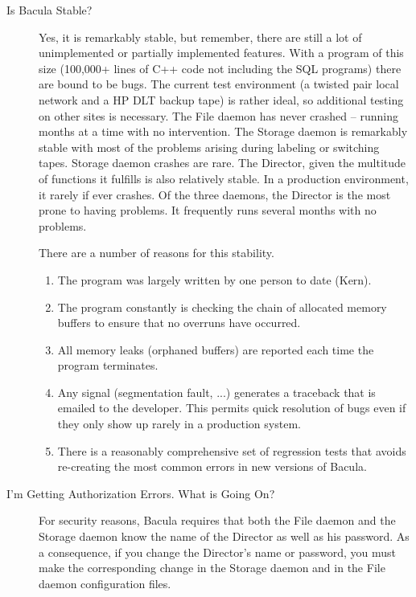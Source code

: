 \begin{description}
\label{stable}
\item [Is Bacula Stable? ]
   Yes, it is remarkably stable, but remember, there are  still a lot of
   unimplemented or partially implemented features.  With a program of this size
   (100,000+ lines of C++ code  not including the SQL programs) there are bound
   to be bugs.  The current test environment (a twisted pair local network and a
   HP DLT  backup tape) is rather ideal, so additional testing on other  sites is
   necessary. The File daemon has never crashed -- running  months at a time with
   no intervention. The Storage daemon is  remarkably stable with most of the
   problems arising during labeling  or switching tapes. Storage daemon crashes
   are rare.  The Director, given the multitude of functions it fulfills is  also
   relatively stable. In a production environment, it rarely  if ever crashes. Of
   the three daemons, the Director is the most  prone to having problems. It
   frequently runs several months with  no problems.  

   There are a number of reasons for this stability.  

   \begin{enumerate}
   \item The program was largely written by one person to date
      (Kern).\\
   \item  The program constantly is checking the chain of allocated
      memory buffers to ensure that no overruns have occurred.  \\
   \item All  memory leaks (orphaned buffers) are reported each time the
      program  terminates.\\
   \item Any signal (segmentation fault, ...) generates a 
      traceback that is emailed to the developer. This permits quick  resolution of
      bugs even if they only show up rarely in a  production system.\\
   \item There is a reasonably comprehensive set of regression tests
      that avoids re-creating the most common errors in new versions of
      Bacula.
   \end{enumerate}

\label{AuthorizationErrors}

\item [I'm Getting Authorization Errors. What is Going On? ]
   For security reasons, Bacula requires that both  the File daemon and the
   Storage daemon know the name  of the Director as well as his password. As a
   consequence,  if you change the Director's name or password, you must  make
   the corresponding change in the Storage daemon and  in the File daemon
   configuration files.  


\end{description}
